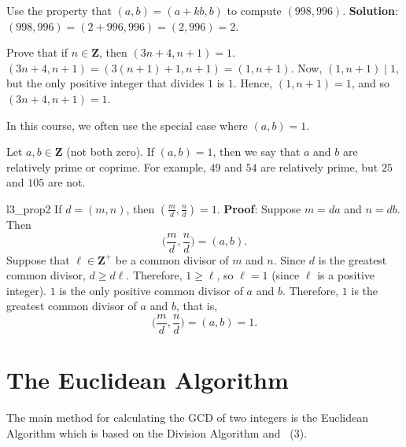 \begin{Example}{}{}
    Use the property that $ (a,b)=(a+kb,b) $ to compute $ (998,996) $.
    \tcblower{}
    \textbf{Solution}: $ (998,996)=(2+996,996)=(2,996)=2 $.
\end{Example}
\begin{Example}{}{}
    Prove that if $ n\in\mathbf{Z} $, then $ (3n+4,n+1)=1 $.
    \tcblower{}
    $ (3n+4,n+1)=(3(n+1)+1,n+1)=(1,n+1) $. Now, $ (1,n+1)\mid 1 $, but the only positive integer that divides $ 1 $
    is $ 1 $. Hence, $ (1,n+1)=1 $, and so $ (3n+4,n+1)=1 $.
\end{Example}
\begin{Remark}{}{}
    In this course, we often use the special case where $ (a,b)=1 $.
\end{Remark}
\begin{Definition}{}{}
    Let $ a,b\in\mathbf{Z} $ (not both zero). If $ (a,b)=1 $, then we say that $ a $ and $ b $ are relatively prime or coprime.
    \tcblower{}
    For example, $ 49 $ and $ 54 $ are relatively prime, but $ 25 $ and $ 105 $ are not.
\end{Definition}
\begin{Proposition}{}{l3_prop2}
    If $ d=(m,n) $, then $ (\frac{m}{d},\frac{n}{d})=1 $.
    \tcblower{}
    \textbf{Proof}: Suppose $ m=da $ and $ n=db $. Then
    \[ \biggl(\frac{m}{d},\frac{n}{d}\biggr)=(a,b). \]
    Suppose that $ \ell\in\mathbf{Z}^+ $ be a common divisor of $ m $ and $ n $. Since $ d $ is the greatest common divisor,
    $ d\ge d\ell $. Therefore, $ 1\ge \ell $, so $ \ell=1 $ (since $ \ell $ is a positive integer). $ 1 $ is the only positive common divisor
    of $ a $ and $ b $. Therefore, $ 1 $ is the greatest common divisor of $ a $ and $ b $, that is,
    \[ \biggl(\frac{m}{d},\frac{n}{d}\biggr)=(a,b)=1. \]
\end{Proposition}
\section{The Euclidean Algorithm}
The main method for calculating the GCD of two integers is the Euclidean
Algorithm which is based on the Division Algorithm and~ (3).

